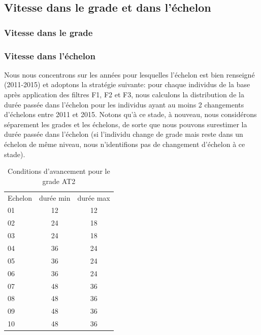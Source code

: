 \documentclass[11pt,a4paper]{article}
\begin{document}
\begin{figure}[ht]
\begin{subfigure}[b]{0.65\linewidth}
    \vspace{4ex}
  \end{subfigure} 
\end{figure}




\clearpage
\subsection{Vitesse dans le grade et dans l'échelon}


\subsubsection*{Vitesse dans le grade}

\subsubsection*{Vitesse dans l'échelon}

Nous nous concentrons sur les années pour lesquelles l'échelon est bien renseigné (2011-2015) et adoptons la stratégie suivante: pour chaque individus de la base après application des filtres F1, F2 et F3, nous calculons la distribution de la durée passée dans l'échelon pour les individus ayant au moins 2 changements d'échelons entre 2011 et 2015. Notons qu'à ce stade, à nouveau, nous considérons séparement les grades et les échelons, de sorte que nous pouvons surestimer la durée passée dans l'échelon (si l'individu change de grade mais reste dans un échelon de même niveau, nous n'identifions pas de changement d'échelon à ce stade). 


\begin{table}[h!]
\label{means}
\centering
\caption{Conditions d'avancement pour le grade AT2} 
\begin{tabular}{l|cc}
\toprule
Echelon &  durée min &  durée max \\
01  &12	&12 \\
02	&24	&18 \\
03	&24	&18\\
04	&36	&24\\
05	&36	&24 \\
06	&36	&24 \\
07	&48	&36 \\
08	&48	&36 \\
09	&48	&36 \\
10	&48	&36	 \\
%	
\bottomrule
\end{tabular}
\end{table}
\end{document}
